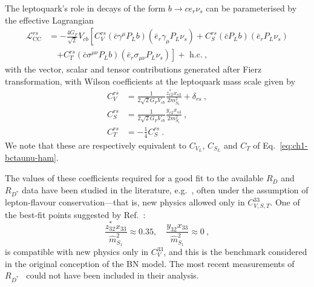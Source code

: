 The leptoquark's role in decays of the form $b \rightarrow c e_r \nu_{s}$ can
be parameterised by the effective Lagrangian~\cite{Sakaki:2013bfa}
\begin{equation}
  \label{eq:ch3-CCHam}
  \begin{split}
    \mathscr{L}^{rs}_{\text{CC}} &= -\frac{4 G_F}{\sqrt{2}} V_{cb} \left[
      C_V^{rs}(\bar{c} \gamma^\mu P_L b)(\bar{e}_r \gamma_\mu P_L
      \nu_{s}) + C^{rs}_S (\bar{c}P_L b)(\bar{e}_r P_L\nu_{s}) \right. \\
    &\quad \left. + C^{rs}_T (\bar{c} \sigma^{\mu \nu} P_L b)
      (\bar{e}_r \sigma_{\mu \nu} P_L \nu_{s})\right] + \text{ h.c.} \ ,
  \end{split}
\end{equation}
with the vector, scalar and tensor contributions generated after Fierz
transformation, with Wilson coefficients at the leptoquark mass scale given by
\begin{subequations} \label{eq:ch3-ccoperators}
  \begin{align}
    C_V^{rs} &= \frac{1}{2 \sqrt{2} G_F V_{cb}} \frac{z_{r2}^* x_{s3}}{2m_{S_{1}}^2} + \delta_{rs} \ , \\
    C_S^{rs} &= \frac{1}{2 \sqrt{2} G_F V_{cb}} \frac{y_{r 2} x_{s 3}}{2m_{S_{1}}^2} \ , \\
    C_T^{rs} &= -\frac{1}{4} C_S^{rs} \ .
  \end{align}
\end{subequations}
We note that these are respectively equivalent to $C_{V_{L}}$, $C_{S_{L}}$ and
$C_{T}$ of Eq.~\eqref{eq:ch1-bctaunu-ham}.

The values of these coefficients required for a good fit to the available $R_D$
and $R_{D^{*}}$ data have been studied in the literature,
e.g.~\cite{Sakaki:2013bfa, Bardhan:2016uhr, Freytsis:2015qca, Choudhury:2016ulr,
  Bhattacharya:2016zcw, Bhattacharya:2015ida}, often under the assumption of
lepton-flavour conservation---that is, new physics allowed only in
$C_{V,S,T}^{33}$. One of the best-fit points suggested by
Ref.~\cite{Freytsis:2015qca}:
\begin{equation} \label{eq:ch3-bfp}
  \frac{z_{32}^* x_{33}}{\hat{m}_{S_{1}}^2} \approx 0.35, \quad \frac{y_{32} x_{33}}{\hat{m}_{S_{1}}^2} \approx 0 \ ,
\end{equation}
is compatible with new physics only in $C_V^{33}$, and this is the benchmark
considered in the original conception of the BN model. The most recent
measurements of $R_{D^*}$~\cite{Hirose:2016wfn, Hirose:2017dxl,
  Abdesselam:2019dgh, Aaij:2017uff, Aaij:2017deq} could not have been included
in their analysis.

